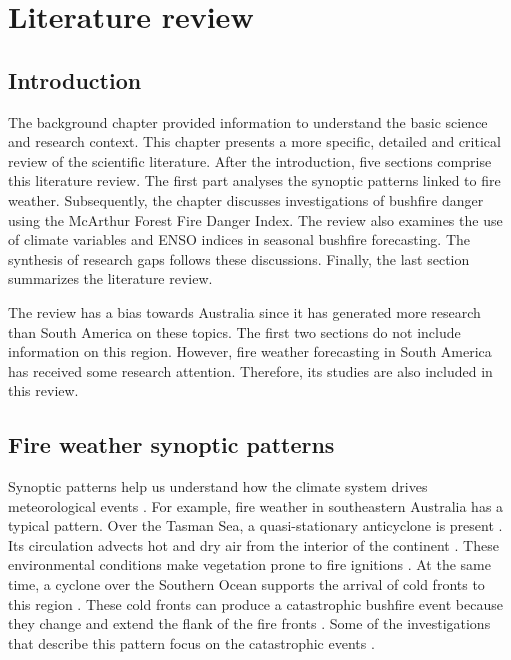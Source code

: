 
\chapter{Literature review}
\newpage{}


\section{Introduction}

The background chapter provided information to understand the basic
science and research context. This chapter presents a more specific,
detailed and critical review of the scientific literature. After the
introduction, five sections comprise this literature review. The first
part analyses the synoptic patterns linked to fire weather. Subsequently,
the chapter discusses investigations of bushfire danger using the
McArthur Forest Fire Danger Index. The review also examines the use
of climate variables and ENSO indices in seasonal bushfire forecasting.
The synthesis of research gaps follows these discussions. Finally,
the last section summarizes the literature review. 

The review has a bias towards Australia since it has generated more
research than South America on these topics. The first two sections
do not include information on this region. However, fire weather forecasting
in South America has received some research attention. Therefore,
its studies are also included in this review.


\section{Fire weather synoptic patterns }

Synoptic patterns help us understand how the climate system drives
meteorological events \citep{Sturman2006}. For example, fire weather
in southeastern Australia has a typical pattern. Over the Tasman Sea,
a quasi-stationary anticyclone is present \citep{BoM2009}. Its circulation
advects hot and dry air from the interior of the continent \citep{Mills2005,Engel2013,Reeder2015}.
These environmental conditions make vegetation prone to fire ignitions
\citep{Williams2012}. At the same time, a cyclone over the Southern
Ocean supports the arrival of cold fronts to this region \citep{Reeder1987}.
These cold fronts can produce a catastrophic bushfire event because
they change and extend the flank of the fire fronts \citep{Mills2005,Engel2013,Reeder2015}.
Some of the investigations that describe this pattern focus on the
catastrophic events \citep{Mills2005,Mills2005a,Cruz2012,Engel2013,Fiddes2015,Reeder2015}.

